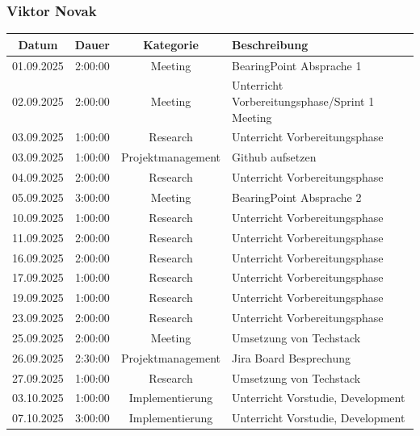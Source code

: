 \documentclass{article}
\begin{document}
\subsubsection*{Viktor Novak}
\begin{table}[H]
  \centering
  \begin{tabularx}{\textwidth}{|c|c|c|X|}
    \hline
    \rowcolor{black!10}\textbf{Datum} & \textbf{Dauer} & \textbf{Kategorie} & \textbf{Beschreibung} \\
    \hline
    01.09.2025 & 2:00:00 & Meeting           & BearingPoint Absprache 1 \\ \hline
    02.09.2025 & 2:00:00 & Meeting           & Unterricht Vorbereitungsphase/Sprint 1 Meeting \\ \hline
    03.09.2025 & 1:00:00 & Research          & Unterricht Vorbereitungsphase \\ \hline
    03.09.2025 & 1:00:00 & Projektmanagement & Github aufsetzen \\ \hline
    04.09.2025 & 2:00:00 & Research          & Unterricht Vorbereitungsphase \\ \hline
    05.09.2025 & 3:00:00 & Meeting           & BearingPoint Absprache 2 \\ \hline
    10.09.2025 & 1:00:00 & Research          & Unterricht Vorbereitungsphase \\ \hline
    11.09.2025 & 2:00:00 & Research          & Unterricht Vorbereitungsphase \\ \hline
    16.09.2025 & 2:00:00 & Research          & Unterricht Vorbereitungsphase \\ \hline
    17.09.2025 & 1:00:00 & Research          & Unterricht Vorbereitungsphase \\ \hline
    19.09.2025 & 1:00:00 & Research          & Unterricht Vorbereitungsphase \\ \hline
    23.09.2025 & 2:00:00 & Research          & Unterricht Vorbereitungsphase \\ \hline
    25.09.2025 & 2:00:00 & Meeting           & Umsetzung von Techstack \\ \hline
    26.09.2025 & 2:30:00 & Projektmanagement & Jira Board Besprechung \\ \hline
    27.09.2025 & 1:00:00 & Research          & Umsetzung von Techstack \\ \hline
    03.10.2025 & 1:00:00 & Implementierung   & Unterricht Vorstudie, Development \\ \hline
    07.10.2025 & 3:00:00 & Implementierung   & Unterricht Vorstudie, Development \\ \hline

\end{tabularx}
\end{table}
\end{document}
